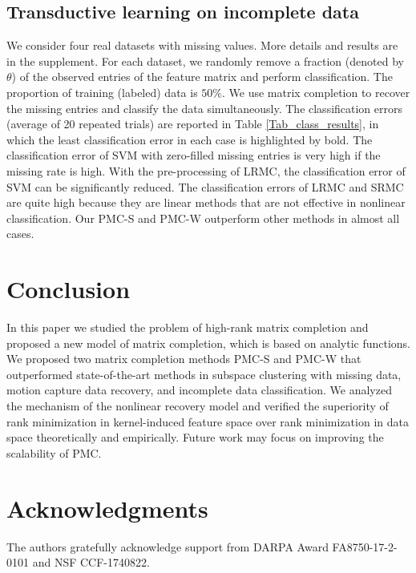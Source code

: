 \documentclass[letterpaper]{article} %
\begin{document}
\subsection{Transductive learning on incomplete data}
We consider four real datasets with missing values. More details and results are in the supplement. For each dataset, we randomly remove a fraction (denoted by $\theta$) of the observed entries of the feature matrix and perform classification. The proportion of training (labeled) data is $50\%$. We use matrix completion to recover the missing entries and classify the data simultaneously. The classification errors (average of 20 repeated trials) are reported in Table \ref{Tab_class_results}, in which the least classification error in each case is highlighted by bold. The classification error of SVM with zero-filled missing entries is very high if the missing rate is high. With the pre-processing of LRMC, the classification error of SVM can be significantly reduced. The classification errors of LRMC and SRMC are quite high because they are linear methods that are not effective in nonlinear classification. Our PMC-S and PMC-W outperform other methods in almost all cases.


\section{Conclusion}
In this paper we studied the problem of high-rank matrix completion and proposed a new model of matrix completion, which is based on analytic functions. We proposed two matrix completion methods PMC-S and PMC-W that outperformed state-of-the-art methods in subspace clustering with missing data, motion capture data recovery, and incomplete data classification. We analyzed the mechanism of the nonlinear recovery model and verified the superiority of rank minimization in kernel-induced feature space over rank minimization in data space theoretically and empirically. Future work may focus on improving the scalability of PMC.

\section{ Acknowledgments}
The authors gratefully acknowledge support from DARPA Award FA8750-17-2-0101 and NSF CCF-1740822.




\fontsize{9.5pt}{10.3pt}\selectfont




\end{document}
